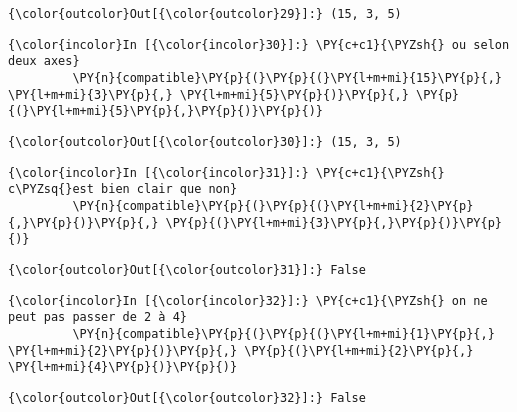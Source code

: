 \begin{Verbatim}[commandchars=\\\{\},frame=single,framerule=0.3mm,rulecolor=\color{cellframecolor}]
{\color{outcolor}Out[{\color{outcolor}29}]:} (15, 3, 5)
\end{Verbatim}
            
    \begin{Verbatim}[commandchars=\\\{\},frame=single,framerule=0.3mm,rulecolor=\color{cellframecolor}]
{\color{incolor}In [{\color{incolor}30}]:} \PY{c+c1}{\PYZsh{} ou selon deux axes}
         \PY{n}{compatible}\PY{p}{(}\PY{p}{(}\PY{l+m+mi}{15}\PY{p}{,} \PY{l+m+mi}{3}\PY{p}{,} \PY{l+m+mi}{5}\PY{p}{)}\PY{p}{,} \PY{p}{(}\PY{l+m+mi}{5}\PY{p}{,}\PY{p}{)}\PY{p}{)}
\end{Verbatim}


\begin{Verbatim}[commandchars=\\\{\},frame=single,framerule=0.3mm,rulecolor=\color{cellframecolor}]
{\color{outcolor}Out[{\color{outcolor}30}]:} (15, 3, 5)
\end{Verbatim}
            
    \begin{Verbatim}[commandchars=\\\{\},frame=single,framerule=0.3mm,rulecolor=\color{cellframecolor}]
{\color{incolor}In [{\color{incolor}31}]:} \PY{c+c1}{\PYZsh{} c\PYZsq{}est bien clair que non}
         \PY{n}{compatible}\PY{p}{(}\PY{p}{(}\PY{l+m+mi}{2}\PY{p}{,}\PY{p}{)}\PY{p}{,} \PY{p}{(}\PY{l+m+mi}{3}\PY{p}{,}\PY{p}{)}\PY{p}{)}
\end{Verbatim}


\begin{Verbatim}[commandchars=\\\{\},frame=single,framerule=0.3mm,rulecolor=\color{cellframecolor}]
{\color{outcolor}Out[{\color{outcolor}31}]:} False
\end{Verbatim}
            
    \begin{Verbatim}[commandchars=\\\{\},frame=single,framerule=0.3mm,rulecolor=\color{cellframecolor}]
{\color{incolor}In [{\color{incolor}32}]:} \PY{c+c1}{\PYZsh{} on ne peut pas passer de 2 à 4}
         \PY{n}{compatible}\PY{p}{(}\PY{p}{(}\PY{l+m+mi}{1}\PY{p}{,} \PY{l+m+mi}{2}\PY{p}{)}\PY{p}{,} \PY{p}{(}\PY{l+m+mi}{2}\PY{p}{,} \PY{l+m+mi}{4}\PY{p}{)}\PY{p}{)}
\end{Verbatim}


\begin{Verbatim}[commandchars=\\\{\},frame=single,framerule=0.3mm,rulecolor=\color{cellframecolor}]
{\color{outcolor}Out[{\color{outcolor}32}]:} False
\end{Verbatim}
            

    
    
    
